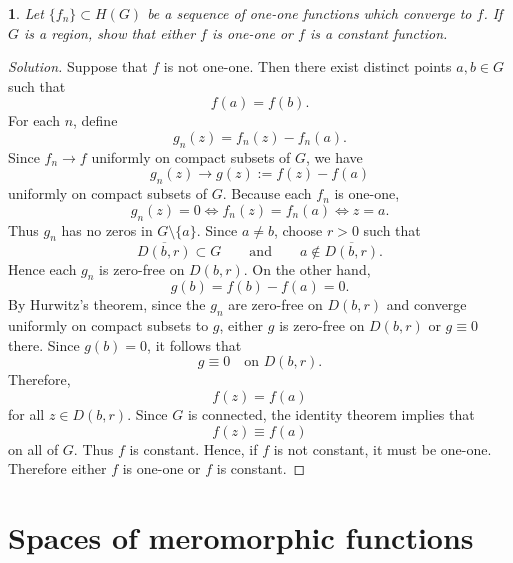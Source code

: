 \documentclass[12pt, a4paper]{report}
\theoremstyle{spaced}
\newtheorem{exercise}{}
\newcommand{\setexercise}[1]{\setcounter{exercise}{#1-1}}
\begin{document}
\setexercise{10}
\begin{exercise}
	Let $\{f_n\}\subset H(G)$ be a sequence of one-one functions which converge
	to $f$. If $G$ is a region, show that either $f$ is one-one or $f$ is a
	constant function.
\end{exercise}
\begin{proof}[Solution]
	Suppose that $f$ is not one-one. Then there exist distinct points
	$a,b\in G$ such that
	\[
		f(a)=f(b).
	\]
	For each $n$, define
	\[
		g_n(z)=f_n(z)-f_n(a).
	\]
	Since $f_n\to f$ uniformly on compact subsets of $G$, we have
	\[
		g_n(z)\to g(z):=f(z)-f(a)
	\]
	uniformly on compact subsets of $G$.
	Because each $f_n$ is one-one,
	\[
		g_n(z)=0
		\iff f_n(z)=f_n(a)
		\iff z=a.
	\]
	Thus $g_n$ has no zeros in $G\setminus\{a\}$.
	Since $a\neq b$, choose $r>0$ such that
	\[
		\overline{D(b,r)}\subset G
		\qquad\text{and}\qquad
		a\notin \overline{D(b,r)}.
	\]
	Hence each $g_n$ is zero-free on $D(b,r)$. On the other hand,
	\[
		g(b)=f(b)-f(a)=0.
	\]
	By Hurwitz's theorem, since the $g_n$ are zero-free on $D(b,r)$ and
	converge uniformly on compact subsets to $g$, either $g$ is zero-free
	on $D(b,r)$ or $g\equiv 0$ there. Since $g(b)=0$, it follows that
	\[
		g\equiv 0 \quad \text{on } D(b,r).
	\]
	Therefore,
	\[
		f(z)=f(a)
	\]
	for all $z\in D(b,r)$. Since $G$ is connected, the identity theorem
	implies that
	\[
		f(z)\equiv f(a)
	\]
	on all of $G$. Thus $f$ is constant.
	Hence, if $f$ is not constant, it must be one-one. Therefore either
	$f$ is one-one or $f$ is constant.
\end{proof}

\section{Spaces of meromorphic functions}
\end{document}
